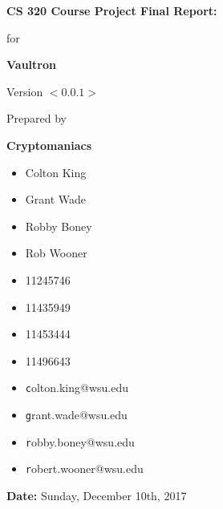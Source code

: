 \documentclass[11pt]{report}
\begin{document}

{\Huge \textbf{CS 320 Course Project Final Report:}}
\vspace{5mm}
\begin{flushright}

    {\huge for}
    \vspace{20mm}

    \textbf{\Huge Vaultron}
    \vspace{20mm}

    {\huge Version $<0.0.1>$}
    \vspace{20mm}

    {\huge Prepared by}
    \vspace{20mm}

    \textbf{\huge Cryptomaniacs}
    \vspace{20mm}
\end{flushright}

\begin{multicols}{3}
    \noindent
    \begin{itemize}
        \item[] {\Large Colton King}
        \item[] {\Large Grant Wade}
        \item[] {\Large Robby Boney}
        \item[] {\Large Rob Wooner}
    \end{itemize}

    \begin{itemize}
        \item[] {\Large 11245746}
        \item[] {\Large 11435949}
        \item[] {\Large 11453444}
        \item[] {\Large 11496643}
    \end{itemize}

    \begin{itemize}
        \item[] {\Large\texttt colton.king@wsu.edu}
        \item[] {\Large\texttt grant.wade@wsu.edu}
        \item[] {\Large\texttt robby.boney@wsu.edu}
        \item[] {\Large\texttt robert.wooner@wsu.edu}
    \end{itemize}
\end{multicols}

\vfill

\begin{flushright}
    \vspace{20mm}
    {\Large \textbf{Date:} Sunday, December 10th, 2017}
\end{flushright}
\end{document}
